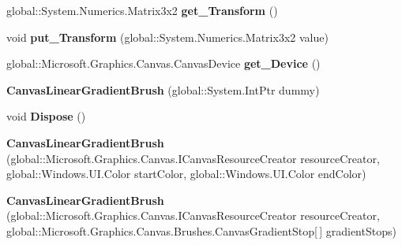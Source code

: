 \begin{DoxyCompactItemize}
global\+::\+System.\+Numerics.\+Matrix3x2 {\bfseries get\+\_\+\+Transform} ()
\item 
\mbox{\label{class_microsoft_1_1_graphics_1_1_canvas_1_1_brushes_1_1_canvas_linear_gradient_brush_acec1fe08236a91f601861e4429109110}} 
void {\bfseries put\+\_\+\+Transform} (global\+::\+System.\+Numerics.\+Matrix3x2 value)
\item 
\mbox{\label{class_microsoft_1_1_graphics_1_1_canvas_1_1_brushes_1_1_canvas_linear_gradient_brush_a3dc1569efd675c587ec865d869f9ffce}} 
global\+::\+Microsoft.\+Graphics.\+Canvas.\+Canvas\+Device {\bfseries get\+\_\+\+Device} ()
\item 
\mbox{\label{class_microsoft_1_1_graphics_1_1_canvas_1_1_brushes_1_1_canvas_linear_gradient_brush_a20aa86e5b7a32843e8561c0415dbee83}} 
{\bfseries Canvas\+Linear\+Gradient\+Brush} (global\+::\+System.\+Int\+Ptr dummy)
\item 
\mbox{\label{class_microsoft_1_1_graphics_1_1_canvas_1_1_brushes_1_1_canvas_linear_gradient_brush_af7428e4f8e3d528affde23a40ae75b52}} 
void {\bfseries Dispose} ()
\item 
\mbox{\label{class_microsoft_1_1_graphics_1_1_canvas_1_1_brushes_1_1_canvas_linear_gradient_brush_a4b33cfab37ecd3d6b6bef46dae48c88c}} 
{\bfseries Canvas\+Linear\+Gradient\+Brush} (global\+::\+Microsoft.\+Graphics.\+Canvas.\+I\+Canvas\+Resource\+Creator resource\+Creator, global\+::\+Windows.\+U\+I.\+Color start\+Color, global\+::\+Windows.\+U\+I.\+Color end\+Color)
\item 
\mbox{\label{class_microsoft_1_1_graphics_1_1_canvas_1_1_brushes_1_1_canvas_linear_gradient_brush_a60887ec32c82a971148a38aea74b62ea}} 
{\bfseries Canvas\+Linear\+Gradient\+Brush} (global\+::\+Microsoft.\+Graphics.\+Canvas.\+I\+Canvas\+Resource\+Creator resource\+Creator, global\+::\+Microsoft.\+Graphics.\+Canvas.\+Brushes.\+Canvas\+Gradient\+Stop\mbox{[}$\,$\mbox{]} gradient\+Stops)

\end{DoxyCompactItemize}

